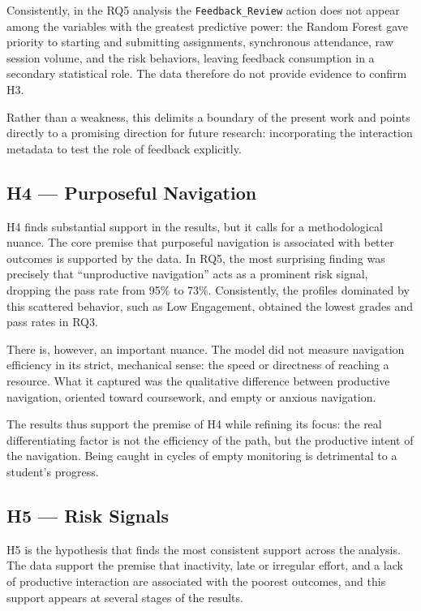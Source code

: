Consistently, in the RQ5 analysis the \texttt{Feedback\_Review} action does not appear among the variables with the greatest predictive power: the Random Forest gave priority to starting and submitting assignments, synchronous attendance, raw session volume, and the risk behaviors, leaving feedback consumption in a secondary statistical role. The data therefore do not provide evidence to confirm H3.

Rather than a weakness, this delimits a boundary of the present work and points directly to a promising direction for future research: incorporating the interaction metadata to test the role of feedback explicitly.

\subsection{H4 --- Purposeful Navigation}

H4 finds substantial support in the results, but it calls for a methodological nuance. The core premise that purposeful navigation is associated with better outcomes is supported by the data. In RQ5, the most surprising finding was precisely that ``unproductive navigation'' acts as a prominent risk signal, dropping the pass rate from 95\% to 73\%. Consistently, the profiles dominated by this scattered behavior, such as Low Engagement, obtained the lowest grades and pass rates in RQ3.

There is, however, an important nuance. The model did not measure navigation efficiency in its strict, mechanical sense: the speed or directness of reaching a resource. What it captured was the qualitative difference between productive navigation, oriented toward coursework, and empty or anxious navigation.

The results thus support the premise of H4 while refining its focus: the real differentiating factor is not the efficiency of the path, but the productive intent of the navigation. Being caught in cycles of empty monitoring is detrimental to a student's progress.

\subsection{H5 --- Risk Signals}

H5 is the hypothesis that finds the most consistent support across the analysis. The data support the premise that inactivity, late or irregular effort, and a lack of productive interaction are associated with the poorest outcomes, and this support appears at several stages of the results.

